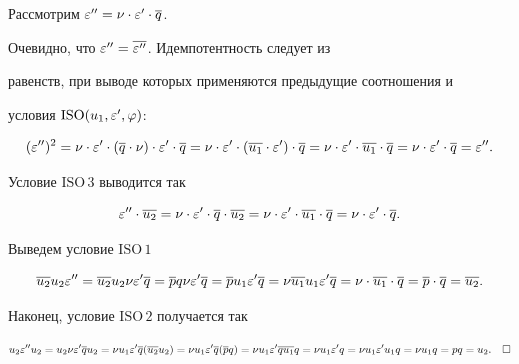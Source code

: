 Рассмотрим $\varepsilon''=\nu\cdot \varepsilon'\cdot \overline{q}$.


Очевидно, что $\varepsilon''=\overline{\varepsilon''}$. Идемпотентность следует из


равенств, при выводе которых применяются предыдущие соотношения и


условия ${\mathrm{ISO}}(u_1,\varepsilon',\varphi)$:


$$


(\ep'')^2=\nu\cdot \ep'\cdot (\o{q}\cdot\nu)\cdot\ep'\cdot \o{q} =


\nu\cdot \ep'\cdot (\o{u_1}\cdot\ep')\cdot \o{q}


= \nu\cdot \ep'\cdot \o{u_1}\cdot \o{q} =


\nu\cdot \ep'\cdot \o{q} = \ep''.


$$





Условие ${\mathrm{ISO\,3}}$ выводится так


$$


\ep''\cdot \o{u_2}=\nu\cdot\ep'\cdot\o{q}\cdot\o{u_2}=


\nu\cdot\ep'\cdot\o{u_1}\cdot\o{q} = \nu\cdot\ep'\cdot\o{q}.


$$





Выведем условие ${\mathrm{ISO\,1}}$


$$


\o{u_2} u_2 \ep''= \o{ u_2} u_2 \nu \ep' \o{q}=


\o{p} q \nu \ep' \o{q}=


\o{p} u_1 \ep'\o{q}=\nu \o{u_1} u_1 \ep' \o{q}=


\nu\cdot\o{u_1}\cdot \o{q}=\o{p}\cdot\o{q}=\o{u_2}.


$$





Наконец, условие ${\mathrm{ISO}\,2} $ получается так


$$




u_2\ep''u_2 = u_2\nu\ep'\o{q}u_2= \nu u_1\ep'\o{q}(\o{u_2}u_2)=


\nu u_1\ep'\o{q}(\o{p}q)=\nu u_1\ep'\o{q}\o{u_1}q=


\nu u_1\ep'q=\nu u_1\ep' u_1 q=\nu u_1 q=pq=u_2.\quad\square


$$






